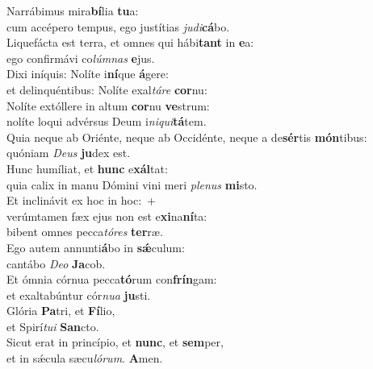 \evenverse Narrábimus mira\textbf{bí}lia \textbf{tu}a:~\*\\
\evenverse cum accépero tempus, ego justítias \textit{ju}\textit{di}\textbf{cá}bo.\\
\oddverse Liquefácta est terra, et omnes qui hábi\textbf{tant} in \textbf{e}a:~\*\\
\oddverse ego confirmávi co\textit{lúm}\textit{nas} \textbf{e}jus.\\
\evenverse Dixi iníquis: Nolíte i\textbf{ní}que \textbf{á}gere:~\*\\
\evenverse et delinquéntibus: Nolíte exal\textit{tá}\textit{re} \textbf{cor}nu:\\
\oddverse Nolíte extóllere in altum \textbf{cor}nu \textbf{ve}strum:~\*\\
\oddverse nolíte loqui advérsus Deum i\textit{ni}\textit{qui}\textbf{tá}tem.\\
\evenverse Quia neque ab Oriénte, neque ab Occidénte, neque a de\textbf{sér}tis \textbf{món}tibus:~\*\\
\evenverse quóniam \textit{De}\textit{us} \textbf{ju}dex est.\\
\oddverse Hunc humíliat, et \textbf{hunc} e\textbf{xál}tat:~\*\\
\oddverse quia calix in manu Dómini vini meri \textit{ple}\textit{nus} \textbf{mi}sto.\\
\evenverse Et inclinávit ex hoc in hoc:~+\\
\evenverse  verúmtamen fæx ejus non est e\textbf{xi}na\textbf{ní}ta:~\*\\
\evenverse bibent omnes pecca\textit{tó}\textit{res} \textbf{ter}ræ.\\
\oddverse Ego autem annunti\textbf{á}bo in \textbf{sǽ}culum:~\*\\
\oddverse cantábo \textit{De}\textit{o} \textbf{Ja}cob.\\
\evenverse Et ómnia córnua pecca\textbf{tó}rum con\textbf{frín}gam:~\*\\
\evenverse et exaltabúntur cór\textit{nu}\textit{a} \textbf{ju}sti.\\
\oddverse Glória \textbf{Pa}tri, et \textbf{Fí}lio,~\*\\
\oddverse et Spirí\textit{tu}\textit{i} \textbf{San}cto.\\
\evenverse Sicut erat in princípio, et \textbf{nunc}, et \textbf{sem}per,~\*\\
\evenverse et in sǽcula sæcu\textit{ló}\textit{rum}. \textbf{A}men.\\
